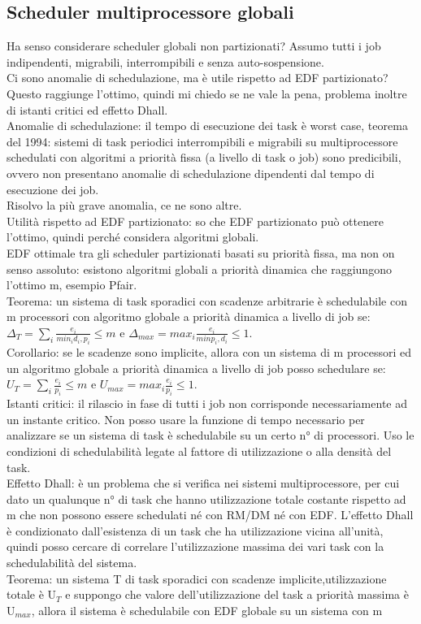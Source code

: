 \documentclass[12pt, oneside]{extbook}
\begin{document}
\subsection{Scheduler multiprocessore globali}
Ha senso considerare scheduler globali non partizionati? Assumo tutti i job indipendenti, migrabili, interrompibili e senza auto-sospensione.\\ Ci sono anomalie di schedulazione, ma è utile rispetto ad EDF partizionato? Questo raggiunge l'ottimo, quindi mi chiedo se ne vale la pena, problema inoltre di istanti critici ed effetto Dhall.\\ Anomalie di schedulazione: il tempo di esecuzione dei task è worst case, teorema del 1994: sistemi di task periodici interrompibili e migrabili su multiprocessore schedulati con algoritmi a priorità fissa (a livello di task o job) sono predicibili, ovvero non presentano anomalie di schedulazione dipendenti dal tempo di esecuzione dei job.\\ Risolvo la più grave anomalia, ce ne sono altre.\\ Utilità rispetto ad EDF partizionato: so che EDF partizionato può ottenere l'ottimo, quindi perché considera algoritmi globali.\\ EDF ottimale tra gli scheduler partizionati basati su priorità fissa, ma non on senso assoluto: esistono algoritmi globali a priorità dinamica che raggiungono l'ottimo m, esempio Pfair.\\ Teorema: un sistema di task sporadici con scadenze arbitrarie è schedulabile con m processori con algoritmo globale a priorità dinamica a livello di job se: \\ $\Delta_T = \sum\limits_{i} \frac{e_i}{min_i{d_i, p_i}} \leq m$ e $\Delta_{max} = max_i \frac{e_i}{min{p_i, d_i}} \leq 1$.\\ Corollario: se le scadenze sono implicite, allora con un sistema di m processori ed un algoritmo globale a priorità dinamica a livello di job posso schedulare se:\\ $U_T = \sum\limits_{i} \frac{e_i}{p_i} \leq m$ e $U_{max} = max_{i} \frac{e_i}{p_i} \leq 1$.\\ Istanti critici: il rilascio in fase di tutti i job non corrisponde necessariamente ad un instante critico. Non posso usare la funzione di tempo necessario per analizzare se un sistema di task è schedulabile su un certo n° di processori. Uso  le condizioni di schedulabilità legate al fattore di utilizzazione o alla densità del task.\\ Effetto Dhall: è un problema che si verifica nei sistemi multiprocessore, per cui dato un qualunque n° di task che hanno utilizzazione totale costante rispetto ad m che non possono essere schedulati né con RM/DM né con EDF. L'effetto Dhall è condizionato dall'esistenza di un task che ha utilizzazione vicina all'unità, quindi posso cercare di correlare l'utilizzazione massima dei vari task con la schedulabilità del sistema.\\ Teorema: un sistema T di task sporadici con scadenze implicite,utilizzazione totale è U$_T$ e suppongo che valore dell'utilizzazione del task a priorità massima è U$_{max}$, allora il sistema è schedulabile con EDF globale su un sistema con m 
\end{document}
